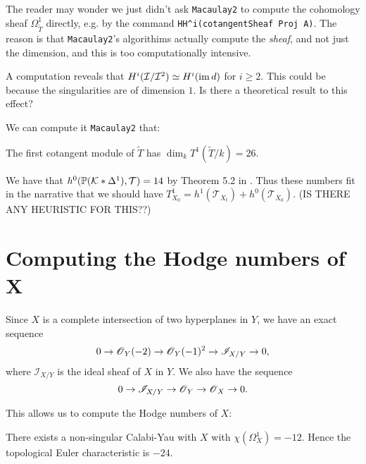 \documentclass[11pt, english]{article}
\begin{document}
\begin{remark}
 The reader may wonder we just didn't ask \verb|Macaulay2| to compute the cohomology sheaf $\Omega_{\widetilde T}^1$ directly, e.g. by the command \verb|HH^i(cotangentSheaf Proj A)|. The reason is that \verb|Macaulay2|'s algorithims actually compute the \emph{sheaf}, and not just the dimension, and this is too computationally intensive.
\end{remark}

\begin{remark}[Question]
A computation reveals that $H^i(\mathcal I/\mathcal I^2) \simeq H^i(\operatorname{im} d)$ for $ i\geq 2$. This could be because the singularities are of dimension $1$. Is there a theoretical result to this effect?
\end{remark}

We can compute it \verb|Macaulay2| that:
\begin{lemma}
The first cotangent module of $\widetilde T$ has $\dim_k T^1(\widetilde T/k) = 26$. 
\end{lemma}

We have that $h^0(\mathbb{P}(\mathcal K \ast \Delta^1),\mathcal T)=14$ by Theorem 5.2 in \cite{deforming_christophersen}. Thus these numbers fit in the narrative that we should have $T^1_{X_0} = h^1(\mathcal T_{X_t}) + h^0(\mathcal T_{X_0})$. (IS THERE ANY HEURISTIC FOR THIS??)

\section{Computing the Hodge numbers of X}

Since $X$ is a complete intersection of two hyperplanes in $Y$, we have an exact sequence
\[
0 \to \operatorname{\mathscr{O}}_Y(-2) \to \operatorname{\mathscr{O}}_Y(-1)^2 \to \mathscr I_{X/Y} \to 0,
\]
where $\mathscr I_{X/Y}$ is the ideal sheaf of $X$ in $Y$. We also have the sequence
\begin{equation}
\label{eqox}
0 \to \mathscr I_{X/Y} \to \operatorname{\mathscr{O}}_Y \to \operatorname{\mathscr{O}}_X \to 0.  
\end{equation}

This allows us to compute the Hodge numbers of $X$:

\begin{thm}
There exists a non-singular Calabi-Yau with $X$ with $\chi(\Omega_X^1)=-12$. Hence the topological Euler characteristic is $-24$.
\end{thm}
\end{document}

